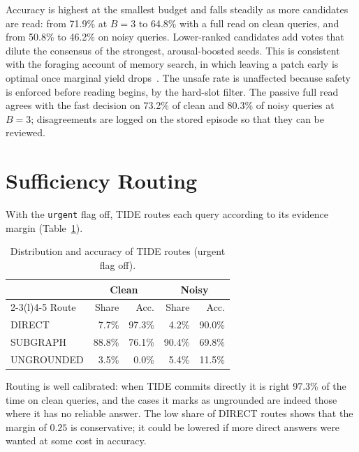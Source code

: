 \documentclass[12pt,a4paper,oneside]{report}
\newcommand{\code}[1]{\texttt{\small #1}}
\begin{document}
Accuracy is highest at the smallest budget and falls steadily as more candidates are read: from 71.9\% at $B=3$ to 64.8\% with a full read on clean queries, and from 50.8\% to 46.2\% on noisy queries. Lower-ranked candidates add votes that dilute the consensus of the strongest, arousal-boosted seeds. This is consistent with the foraging account of memory search, in which leaving a patch early is optimal once marginal yield drops~\cite{hills2012}. The unsafe rate is unaffected because safety is enforced before reading begins, by the hard-slot filter. The passive full read agrees with the fast decision on 73.2\% of clean and 80.3\% of noisy queries at $B=3$; disagreements are logged on the stored episode so that they can be reviewed.

\section{Sufficiency Routing}
With the \code{urgent} flag off, TIDE routes each query according to its evidence margin (Table~\ref{tab:route}).

\begin{table}[H]
\centering
\caption{Distribution and accuracy of TIDE routes (urgent flag off).}
\label{tab:route}
\small
\begin{tabular}{@{}lrrrr@{}}
\toprule
& \multicolumn{2}{c}{Clean} & \multicolumn{2}{c}{Noisy}\\
\cmidrule(lr){2-3}\cmidrule(l){4-5}
Route & Share & Acc. & Share & Acc.\\
\midrule
DIRECT & 7.7\% & 97.3\% & 4.2\% & 90.0\%\\
SUBGRAPH & 88.8\% & 76.1\% & 90.4\% & 69.8\%\\
UNGROUNDED & 3.5\% & 0.0\% & 5.4\% & 11.5\%\\
\bottomrule
\end{tabular}
\end{table}

\noindent Routing is well calibrated: when TIDE commits directly it is right 97.3\% of the time on clean queries, and the cases it marks as ungrounded are indeed those where it has no reliable answer. The low share of DIRECT routes shows that the margin of $0.25$ is conservative; it could be lowered if more direct answers were wanted at some cost in accuracy.
\end{document}
